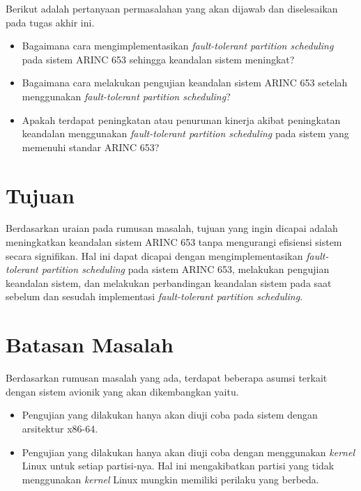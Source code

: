 Berikut adalah pertanyaan permasalahan yang akan dijawab dan diselesaikan pada tugas akhir ini.

\begin{itemize}

    \item Bagaimana cara mengimplementasikan \textit{fault-tolerant partition scheduling} pada
    	    sistem ARINC 653 sehingga keandalan sistem meningkat?

    \item Bagaimana cara melakukan pengujian keandalan sistem ARINC 653 setelah menggunakan
    	    \textit{fault-tolerant partition scheduling}?

    \item Apakah terdapat peningkatan atau penurunan kinerja akibat peningkatan keandalan
    	    menggunakan \textit{fault-tolerant partition scheduling} pada sistem yang memenuhi
    	    standar ARINC 653?

\end{itemize}

\section{Tujuan}
\label{section:tujuan}

Berdasarkan uraian pada rumusan masalah, tujuan yang ingin dicapai adalah meningkatkan keandalan
sistem ARINC 653 tanpa mengurangi efisiensi sistem secara signifikan. Hal ini dapat dicapai
dengan mengimplementasikan \textit{fault-tolerant partition scheduling} pada sistem ARINC 653,
melakukan pengujian keandalan sistem, dan melakukan perbandingan keandalan sistem pada saat
sebelum dan sesudah implementasi \textit{fault-tolerant partition scheduling}.

\section{Batasan Masalah}
\label{section:batasan_masalah}

Berdasarkan rumusan masalah yang ada, terdapat beberapa asumsi terkait dengan sistem avionik
yang akan dikembangkan yaitu.

\begin{itemize}

    \item Pengujian yang dilakukan hanya akan diuji coba pada sistem dengan
    	    arsitektur x86-64.

    \item Pengujian yang dilakukan hanya akan diuji coba dengan menggunakan
    	    \textit{kernel} Linux untuk setiap partisi-nya.  Hal ini mengakibatkan partisi yang
    	    tidak menggunakan \textit{kernel} Linux mungkin memiliki perilaku yang berbeda.

\end{itemize}

